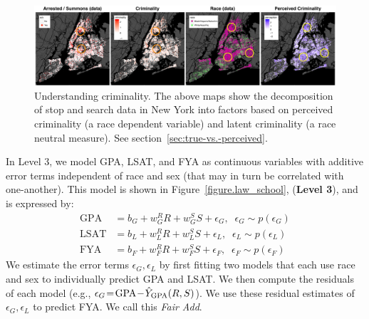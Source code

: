 \begin{figure}[!th]
\begin{center}
\vspace{-2ex}
\centerline{\includegraphics[width=\textwidth]{stop_and_frisk_graphs.png}}
\vspace{-2ex}
\caption{Understanding criminality. The above maps show the decomposition of stop and search data in New York into factors based on perceived criminality (a race dependent variable) and latent criminality (a race neutral measure). See section~\ref{sec:true-vs.-perceived}.     \label{figure.criminality}\vspace{-7ex}}
\end{center}
\end{figure}


In Level 3, we model GPA, LSAT, and FYA as continuous variables with additive error terms independent of race and sex (that may in turn be correlated with one-another). This model is shown in Figure~\ref{figure.law_school}, (\textbf{Level 3}), and is expressed by: %
\begin{align}
\mbox{GPA} &= b_{G} + w_{G}^R R + w_{G}^S S + \epsilon_G, \;\; \epsilon_G \sim p(\epsilon_G) \nonumber \\
\mbox{LSAT} &= b_{L} + w_{L}^R R + w_{L}^S S + \epsilon_L, \;\; \epsilon_L \sim p(\epsilon_L) \nonumber \\
\mbox{FYA} &= b_{F} + w_{F}^R R + w_{F}^S S + \epsilon_F, \;\; \epsilon_F \sim p(\epsilon_F) \nonumber
\end{align}
We estimate the error terms $\epsilon_G,\epsilon_L$ by first fitting two models that each use race and sex to individually predict GPA and LSAT. We then compute the residuals of each model (e.g., $\epsilon_G \!=\! \mbox{GPA} \!-\! \hat{Y}_{\scriptsize\mbox{GPA}}(R,S)$). We use these residual estimates of $\epsilon_G,\epsilon_L$ to predict FYA. We call this \emph{Fair Add}.




